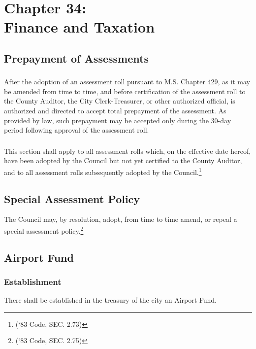\chapter*{Chapter 34: \\
	Finance and Taxation}
    \vfill
    \minitoc
    \pagebreak
    
\section{Prepayment of Assessments}
\subsection{}
After the adoption of an assessment roll pursuant to M.S. Chapter 429, as it may be amended from time to time, and before certification of the assessment roll to the County Auditor, the City Clerk-Treasurer, or other authorized official, is authorized and directed to accept total prepayment of the assessment.  As provided by law, such prepayment may be accepted only during the 30-day period following approval of the assessment roll.
\subsection{}
This section shall apply to all assessment rolls which, on the effective date hereof, have been adopted by the Council but not yet certified to the County Auditor, and to all assessment rolls subsequently adopted by the Council.\footnote{(‘83 Code, SEC. 2.73)}

\section{Special Assessment Policy}
The Council may, by resolution, adopt, from time to time amend, or repeal a special assessment policy.\footnote{(‘83 Code, SEC. 2.75)}

\section{Airport Fund}
\subsection{Establishment}
There shall be established in the treasury of the city an Airport Fund.
